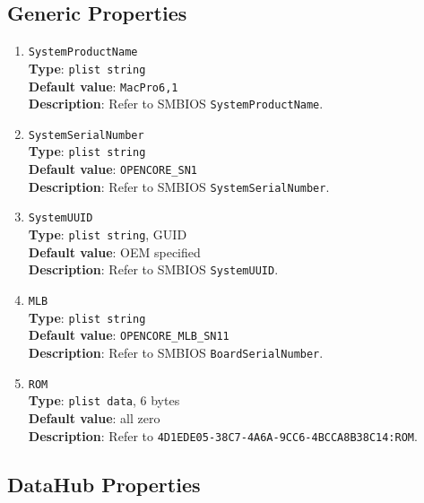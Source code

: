 \documentclass[]{article}
\begin{document}
\subsection{Generic Properties}\label{platforminfogeneric}

\begin{enumerate}
\item
  \texttt{SystemProductName}\\
  \textbf{Type}: \texttt{plist\ string}\\
  \textbf{Default value}: \texttt{MacPro6,1}\\
  \textbf{Description}: Refer to SMBIOS \texttt{SystemProductName}.
\item
  \texttt{SystemSerialNumber}\\
  \textbf{Type}: \texttt{plist\ string}\\
  \textbf{Default value}: \texttt{OPENCORE\_SN1}\\
  \textbf{Description}: Refer to SMBIOS \texttt{SystemSerialNumber}.
\item
  \texttt{SystemUUID}\\
  \textbf{Type}: \texttt{plist\ string}, GUID\\
  \textbf{Default value}: OEM specified\\
  \textbf{Description}: Refer to SMBIOS \texttt{SystemUUID}.
\item
  \texttt{MLB}\\
  \textbf{Type}: \texttt{plist\ string}\\
  \textbf{Default value}: \texttt{OPENCORE\_MLB\_SN11}\\
  \textbf{Description}: Refer to SMBIOS \texttt{BoardSerialNumber}.
\item
  \texttt{ROM}\\
  \textbf{Type}: \texttt{plist\ data}, 6 bytes\\
  \textbf{Default value}: all zero\\
  \textbf{Description}: Refer to
  \texttt{4D1EDE05-38C7-4A6A-9CC6-4BCCA8B38C14:ROM}.

\end{enumerate}

\subsection{DataHub Properties}\label{platforminfodatahub}
\end{document}
